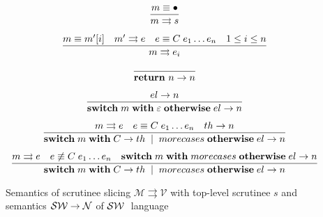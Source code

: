  
 \begin{figure}
    \[
    \begin{array}{cr}
      \dfrac{m \equiv \bullet} { m \rightrightarrows s} & 
        \\[5mm]
      \dfrac{m \equiv m'[i]\quad m'\rightrightarrows e\quad e\equiv C\;e_1\dots e_n\quad 1\le i\le n} { m \rightrightarrows e_i} & 
        \\[5mm]
      \dfrac{}{\mathbf{return}\ n \rightarrow n} &       
        \\[5mm]
      \dfrac{el \rightarrow n} {\mathbf{switch}\;m \; \mathbf{with}\;\varepsilon\;\mathbf{otherwise}\;el \rightarrow n} &       
        \\[5mm]
      \dfrac{m \rightrightarrows e \quad e\equiv C\; e_1\dots e_n\quad th \rightarrow n} {\mathbf{switch}\;m \; \mathbf{with}\;C\rightarrow th\; \mid\; morecases\;\mathbf{otherwise}\;el \rightarrow n} &       
        \\[5mm]
      \dfrac{m \rightrightarrows e \quad e\not\equiv C\; e_1\dots e_n\quad 
       {\mathbf{switch}\;m \; \mathbf{with}\; morecases\;\mathbf{otherwise}\;el } \rightarrow n} {\mathbf{switch}\;m \; \mathbf{with}\;C\rightarrow th\; \mid\; morecases\;\mathbf{otherwise}\;el \rightarrow n} &       
    \end{array}
    \]
    \caption{Semantics of scrutinee slicing $\mathcal{M} \rightrightarrows \mathcal{V}$ with top-level scrutinee $s$ and semantics $\mathcal{S}\mathcal{W}\rightarrow \mathcal{N}$  of 
    $\mathcal{S}\mathcal{W}\;$
    language
    }
   \label{fig:ir_switch}
\end{figure}

\begin{comment} 
 \begin{figure}
    \[
    \begin{array}{cr}
      \dfrac{m \equiv \bullet} { m \rightrightarrows s} & 
        \\[5mm]
      \dfrac{m \equiv m'[i]\quad m'\rightrightarrows e\quad e\equiv C\;e_1\dots e_n\quad 1\le i\le n} { m \rightrightarrows e_i} & 
        \\[5mm]
      \dfrac{}{\primi{return}\ n \rightarrow n} &       
        \\[5mm]
      \dfrac{m \rightrightarrows e \quad e\equiv C\; e_1\dots e_n\quad th \rightarrow n} {\primi{if}\;\mathcal{C}\;m \; \primi{then}\;th\;\primi{else}\;el \rightarrow n} &       
        \\[5mm]
      \dfrac{m \rightrightarrows e \quad e\not\equiv C\; e_1\dots e_n\quad el \rightarrow n} {\primi{if}\;\mathcal{C}\;m\;\primi{then}\;th\;\primi{else}\;el \rightarrow n} &       
    \end{array}
    \]
    \caption{Semantics of scrutinee slicing $\mathcal{M} \rightrightarrows \mathcal{V}$ with top-level scrutinee $s$ and semantics $\ir\rightarrow \mathcal{N}$  of $\ir\;$ language
    }
   \label{fig:ir}
 \end{figure}
\end{comment} 


